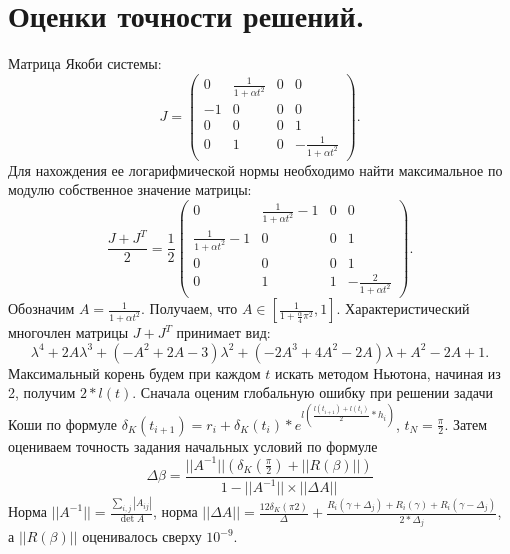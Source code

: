 \documentclass{article}
\begin{document}
\section{Оценки точности решений.}
Матрица Якоби системы:
$$J =
\begin{pmatrix}
  0 & \frac{1}{1 + \alpha t^{2}} & 0 & 0\\
  -1 & 0 & 0 & 0\\
  0 & 0 & 0 & 1\\
  0 & 1 & 0 & -\frac{1}{1 + \alpha t^{2}}
\end{pmatrix}.$$
Для нахождения ее логарифмической нормы необходимо найти максимальное
по модулю собственное значение матрицы:
$$\frac{J + J^{T}}2 = \frac 1 2
\begin{pmatrix}
  0 & \frac{1}{1 + \alpha t^{2}}-1 & 0 & 0\\
  \frac{1}{1 + \alpha t^{2}}-1 & 0 & 0 & 1\\
  0 & 0 & 0 & 1\\
  0 & 1 & 1 & -\frac{2}{1 + \alpha t^{2}}
\end{pmatrix}.$$
Обозначим $A = \frac{1}{1 + \alpha t^{2}}$. Получаем, что $A \in
[\frac{1}{1 + \frac{\alpha}{4}\pi^{2}}, 1]$.
Характеристический многочлен матрицы $J + J^{T}$ принимает вид:
\[\lambda^{4} + 2A\lambda^{3} + \left(-A^{2} + 2A
  -3\right)\lambda^{2} + \left(-2A^{3} + 4A^{2} - 2A\right)\lambda +
A^{2} - 2A + 1.\]
Максимальный корень будем при каждом $t$ искать методом Ньютона,
начиная из 2, получим $2*l(t)$.
Сначала оценим глобальную ошибку при решении задачи Коши по формуле
$\delta_{K}(t_{i+1}) = r_{i} +
\delta_{K}(t_{i})*e^{l\left(\frac{l(t_{i+1}) +
l(t_{i})}{2}*h_{i}\right)}$, $t_{N} = \frac \pi 2$.
Затем оцениваем точность задания начальных условий по формуле
\[\Delta \beta = \frac{||A^{-1}||\left(\delta_{K}\left(\frac \pi
2\right) + ||R(\beta)||\right)}{1 - ||A^{-1}||\times ||\Delta A||}\]
Норма $||A^{-1}|| = \frac{\sum\limits_{i,j}|A_{ij}|}{\det A}$,
норма $||\Delta A|| = \frac{12\delta_{K}(\pi 2)}{\Delta} +
\frac{R_{i}(\gamma + \Delta_{j}) + R_{i}(\gamma) + R_{i}(\gamma -
\Delta_{j})}{2*\Delta_{j}}$,
а $||R(\beta)||$ оценивалось сверху $10^{-9}$.
\end{document}
